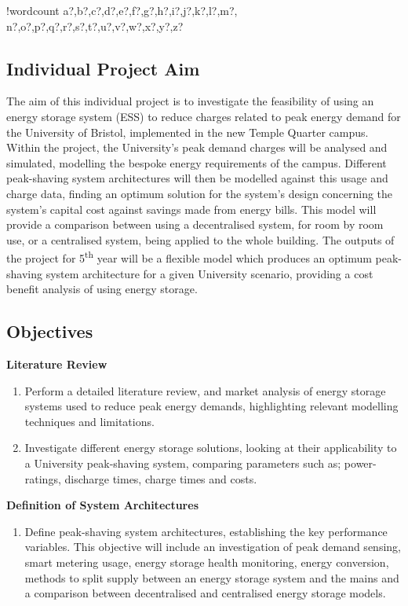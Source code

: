 \documentclass[fontsize=9.5pt]{extarticle}
\newcounter{words}
\newenvironment{counted}{%
  \setcounter{words}{0}
  \SearchList!{wordcount}{\stepcounter{words}}
    {a?,b?,c?,d?,e?,f?,g?,h?,i?,j?,k?,l?,m?,
    n?,o?,p?,q?,r?,s?,t?,u?,v?,w?,x?,y?,z?}
  \UndoBoundary{'}
  \SearchOrder{p;}}{%
  \StopSearching}
\begin{document}
\begin{counted}
\subsection{Individual Project Aim}\label{individual-project-aim}

The aim of this individual project is to investigate the feasibility of
using an energy storage system (ESS) to reduce charges related to peak
energy demand for the University of Bristol, implemented in the new
Temple Quarter campus. Within the project, the University's peak demand
charges will be analysed and simulated, modelling the bespoke energy
requirements of the campus. Different peak-shaving system architectures
will then be modelled against this usage and charge data, finding an
optimum solution for the system's design concerning the system's capital
cost against savings made from energy bills. This model will provide a
comparison between using a decentralised system, for room by room use,
or a centralised system, being applied to the whole building. The
outputs of the project for 5\textsuperscript{th} year will be a flexible
model which produces an optimum peak-shaving system architecture for a
given University scenario, providing a cost benefit analysis of using
energy storage.

\subsection{Objectives}\label{objectives}

\textbf{Literature Review}

\begin{enumerate}
\item Perform a detailed literature review, and market analysis of energy storage systems used to reduce peak energy demands, highlighting relevant modelling techniques and limitations.
\item Investigate different energy storage solutions, looking at their applicability to a University peak-shaving system, comparing parameters such as; power-ratings, discharge times, charge times and costs.
\end{enumerate}

\textbf{Definition of System Architectures}

\begin{enumerate}[resume]
\item Define peak-shaving system architectures, establishing the key performance variables. This objective will include an investigation of peak demand sensing, smart metering usage, energy storage health monitoring, energy conversion, methods to split supply between an energy storage system and the mains and a comparison between decentralised and centralised energy storage models.


\end{enumerate}
\end{counted}
\end{document}
